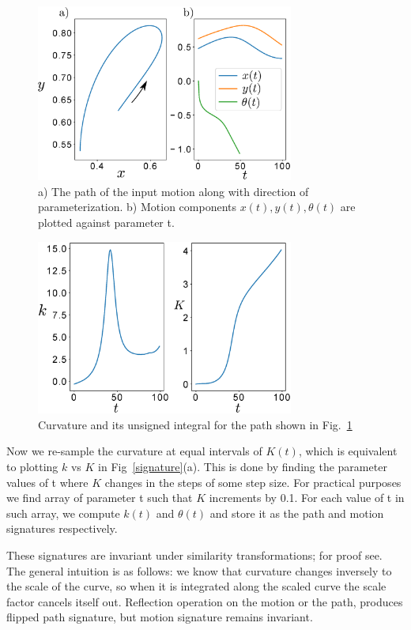 \documentclass[twocolumn,10pt]{asme2e}
\begin{document}
\begin{figure}
\centering
\includegraphics[width=240pt]{figure/fig_bspline.eps}
  \caption{a) The path of the input motion along with direction of parameterization. b) Motion components $x(t), y(t), \theta(t)$ are plotted against parameter t.}
\label{bsplineFitting}
\end{figure}

\begin{figure}
\centering
\includegraphics[width=240pt]{figure/fig_curvatureK.eps}
  \caption{Curvature and its unsigned integral for the path shown in Fig.~\ref{bsplineFitting}}
\label{curvatureK}
\end{figure}

Now we re-sample the curvature at equal intervals of $K(t)$, which is equivalent to plotting $k$ vs $K$ in Fig~\ref{signature}(a).
This is done by finding the parameter values of t where $K$ changes in the steps of some step size. For practical purposes we find array of parameter t such that $K$ increments by 0.1.
For each value of t in such array, we compute $k(t)$ and $\theta(t)$ and store it as the path and motion signatures respectively.

These signatures are invariant under similarity transformations; for proof see\cite{cui2009}.
The general intuition is as follows:
we know that curvature changes inversely to the scale of the curve, so when it is integrated along the scaled curve the scale factor cancels itself out.
Reflection operation on the motion or the path, produces flipped path signature, but motion signature remains invariant.
\end{document}
